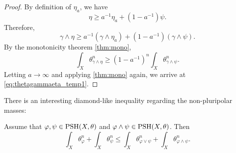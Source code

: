 \begin{proof}
    By definition of $\eta_a$, we have
    \[
    \eta\geq a^{-1}\eta_a+\left(1-a^{-1}\right)\psi.
    \]
    Therefore,
    \[
    \gamma\land \eta\geq a^{-1} (\gamma\land \eta_a)+\left(1-a^{-1}\right) \left( \gamma\land\psi \right).
    \]
    By the monotonicity theorem \cref{thm:mono},
    \[
    \int_X \theta_{\gamma\land \eta}^n\geq \left(1-a^{-1}\right)^n\int_X \theta_{\gamma\land \psi}^n.
    \]
    Letting $a\to \infty$ and applying \cref{thm:mono} again, we arrive at \eqref{eq:thetagammaeta_temp1}.
\end{proof}

There is an interesting diamond-like inequality regarding the non-pluripolar masses:
\begin{theorem}\label{thm:diamond}
    Assume that $\varphi,\psi\in \mathrm{PSH}(X,\theta)$ and $\varphi\land \psi\in \mathrm{PSH}(X,\theta)$. Then
    \begin{equation}\label{eq:diamond}
        \int_X \theta_{\varphi}^n+\int_X \theta_{\psi}^n\leq \int_X \theta_{\varphi\lor \psi}^n+\int_X \theta_{\varphi\land \psi}^n.
    \end{equation}
\end{theorem}
